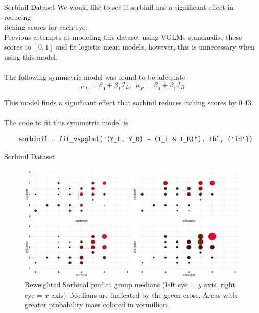\documentclass[9pt,notes=hide]{beamer}
\newcommand{\linkcolor}{Data61 green}
\newcommand{\vermillion}{Data61 vermillion}
\begin{document}
\begin{frame}[fragile]{Sorbinil Dataset}
	We would like to see if sorbinil has a significant effect in reducing\\  
        itching scores for each eye.
	\vspace{0.3cm}\\
	\pause
        Previous attempts at modeling this dataset using VGLMs standardise
        these scores to $[0,1]$ and fit logistic mean models,
	however, this is  unnecessary when using this model. \\
	\pause
	\vspace{0.1cm}\\
	The following symmetric model was found to be adequate
	\[
		\mu_L = \beta_0 + \beta_1 \mathcal{I}_L,  \  \ \mu_R = \beta_0 + \beta_1 \mathcal{I}_R
	\]

	\pause
	This model finds  a significant effect that sorbinil reduces itching scores by $0.43$.\\
	\pause
	\vspace{0.5cm}\\
	The code to fit this symmetric model is
	\begin{verbatim}
    sorbinil = fit_vspglm(["(Y_L, Y_R) ~ (I_L & I_R)"], tbl, {'id'})
 \end{verbatim}
\end{frame}


\begin{frame}{Sorbinil Dataset}
	\begin{figure}
		\centering
		\includegraphics[width= \linewidth]{figures/sorbinil_pmfs.png}
		\caption{
                    {\small Reweighted Sorbinal pmf at group medians (left eye = $y$ axis, right eye = $x$ axis).
                Medians are indicated by the \textcolor{\linkcolor}{green} cross. 
                Areas with greater probability mass colored in \textcolor{\vermillion}{vermillion}.}}
	\end{figure}
\end{frame}
\end{document}
